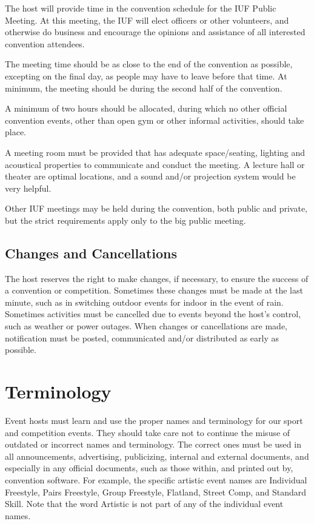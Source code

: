 The host will provide time in the convention schedule for the IUF Public Meeting.
At this meeting, the IUF will elect officers or other volunteers, and otherwise do business and encourage the opinions and assistance of all interested convention attendees.

The meeting time should be as close to the end of the convention as possible, excepting on the final day, as people may have to leave before that time.
At minimum, the meeting should be during the second half of the convention.

A minimum of two hours should be allocated, during which no other official convention events, other than open gym or other informal activities, should take place.

A meeting room must be provided that has adequate space/seating, lighting and acoustical properties to communicate and conduct the meeting.
A lecture hall or theater are optimal locations, and a sound and/or projection system would be very helpful.

Other IUF meetings may be held during the convention, both public and private, but the strict requirements apply only to the big public meeting.

\section{Changes and Cancellations}

The host reserves the right to make changes, if necessary, to ensure the success of a convention or competition.
Sometimes these changes must be made at the last minute, such as in switching outdoor events for indoor in the event of rain.
Sometimes activities must be cancelled due to events beyond the host's control, such as weather or power outages.
When changes or cancellations are made, notification must be posted, communicated and/or distributed as early as possible.

\chapter{Terminology}

Event hosts must learn and use the proper names and terminology for our sport and competition events.
They should take care not to continue the misuse of outdated or incorrect names and terminology.
The correct ones must be used in all announcements, advertising, publicizing, internal and external documents, and especially in any official documents, such as those within, and printed out by, convention software.
For example, the specific artistic event names are Individual Freestyle, Pairs Freestyle, Group Freestyle, Flatland, Street Comp, and Standard Skill.
Note that the word Artistic is not part of any of the individual event names.

